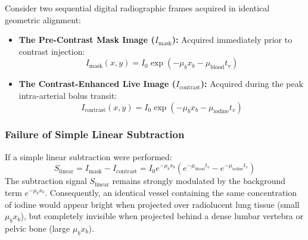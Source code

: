 \documentclass[11pt,a4paper]{article}
\begin{document}
Consider two sequential digital radiographic frames acquired in identical geometric alignment:
\begin{itemize}[leftmargin=*]
    \item \textbf{The Pre-Contrast Mask Image ($I_{\text{mask}}$):} Acquired immediately prior to contrast injection:
    \begin{equation}
        I_{\text{mask}}(x,y) = I_0 \exp\left( -\mu_b x_b - \mu_{\text{blood}} t_v \right)
    \end{equation}
    \item \textbf{The Contrast-Enhanced Live Image ($I_{\text{contrast}}$):} Acquired during the peak intra-arterial bolus transit:
    \begin{equation}
        I_{\text{contrast}}(x,y) = I_0 \exp\left( -\mu_b x_b - \mu_{\text{iodine}} t_v \right)
    \end{equation}
\end{itemize}

\subsubsection{Failure of Simple Linear Subtraction}
If a simple linear subtraction were performed:
\begin{equation}
    S_{\text{linear}} = I_{\text{mask}} - I_{\text{contrast}} = I_0 e^{-\mu_b x_b} \left( e^{-\mu_{\text{blood}} t_v} - e^{-\mu_{\text{iodine}} t_v} \right)
\end{equation}
The subtraction signal $S_{\text{linear}}$ remains strongly modulated by the background term $e^{-\mu_b x_b}$. Consequently, an identical vessel containing the same concentration of iodine would appear bright when projected over radiolucent lung tissue (small $\mu_b x_b$), but completely invisible when projected behind a dense lumbar vertebra or pelvic bone (large $\mu_b x_b$).
\end{document}
